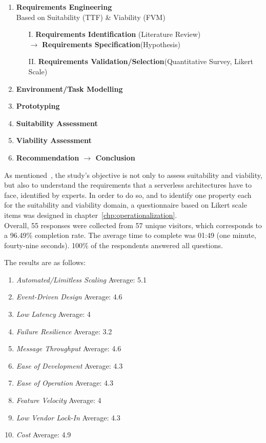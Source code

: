 \begin{enumerate}[nolistsep]
        \item \textbf{Requirements Engineering}\\
            Based on Suitability (TTF) \& Viability (FVM)
            \begin{enumerate}
                \item[I. ] \textbf{Requirements Identification} (Literature Review)\\
                    $\longrightarrow$ \textbf{Requirements Specification}(Hypothesis)
                \item[II. ] \textbf{Requirements Validation/Selection}(Quantitative Survey, Likert Scale)
            \end{enumerate}
        \item \textbf{Environment/Task Modelling}
        \item \textbf{Prototyping}
        \item \textbf{Suitability Assessment} 
        \item \textbf{Viability Assessment}
        \item \textbf{Recommendation $\longrightarrow$ Conclusion}
\end{enumerate}

As mentioned~, the study's objective is not only to assess suitability and viability, but also to understand the requirements that a serverless architectures have to face, identified by experts. In order to do so, and to identify one property each for the suitability and viability domain, a questionnaire based on Likert scale items was designed in chapter~\vref{chp:operationalization}.\\
Overall,
55 responses were collected from
57 unique visitors, which corresponds to a
96.49\% completion rate. The average time to complete was 
01:49 (one minute, fourty-nine seconds).
100\% of the respondents answered all questions. 

\begin{minipage}{\textwidth}
    The results are as follows:
    
    \begin{enumerate}[nolistsep]\label{lst:surveyResults2}
        \item \textit{Automated/Limitless Scaling} Average: 5.1
        \item \textit{Event-Driven Design} Average: 4.6
        \item \textit{Low Latency} Average: 4
        \item \textit{Failure Resilience} Average: 3.2
        \item \textit{Message Throughput} Average: 4.6
        \item \textit{Ease of Development} Average: 4.3
        \item \textit{Ease of Operation} Average: 4.3
        \item \textit{Feature Velocity} Average: 4
        \item \textit{Low Vendor Lock-In} Average: 4.3
        \item \textit{Cost} Average: 4.9
    \end{enumerate}
\end{minipage}

